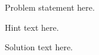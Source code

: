 
Problem statement here.

\begin{hint}
Hint text here.
\end{hint}

\begin{solution}
Solution text here.
\end{solution}